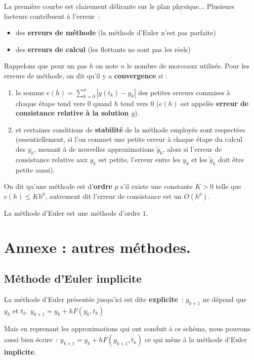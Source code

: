 La première courbe est clairement délirante sur le plan physique...
Plusieurs facteurs contribuent à l'erreur~:

\begin{itemize}
\item des \textbf{erreurs de méthode} (la méthode d'Euler n'est pas parfaite)
\item des \textbf{erreurs de calcul} (les flottants ne sont pas les réels)
\end{itemize}

Rappelons que pour un pas $h$ on note $n$ le nombre de morceaux utilisés. Pour les erreurs de méthode, on dit qu'il y a \textbf{convergence} si :
\begin{enumerate}
\item la somme $e(h)=\displaystyle\sum_{k=0}^n |y(t_k)-y_k|$ des petites erreurs 
commises à 
chaque étape tend vers $0$ quand $h$ tend vers $0$ ($e(h)$ est appelée 
  \textbf{erreur de consistance relative à la solution $y$}).
\item et certaines conditions de \textbf{stabilité} de la méthode employée sont
  respectées (essentiellement, si l'on commet une petite erreur à chaque étape du calcul des $y_k$, 
  menant à de nouvelles approximations $\tilde{y}_k$, alors si l'erreur de consistance relative aux $y_k$
  est petite, l'erreur entre les $y_k$ et les $\tilde{y}_k$ doit être petite aussi).
\end{enumerate}

On dit qu'une méthode est d'\textbf{ordre $p$} s'il existe une constante $K>0$ telle que
$e(h)\leq Kh^p$, autrement dit l'erreur de consistance est un $O(h^{p})$.

La méthode d'Euler est une méthode d'ordre $1$.


\section{Annexe : autres méthodes.}
\subsection{Méthode d'Euler implicite}
La méthode d'Euler présentée jusqu'ici est dite \textbf{explicite}~:
$y_{k+1}$ ne dépend que $y_k$ et $t_k$.
$
 y_{k+1} = y_{k} + h F(y_{k},t_{k})
$

Mais en reprenant les approximations qui ont conduit à ce schéma, 
nous pouvons aussi bien écrire~: $ y_{k+1} = y_{k} + h F(y_{k+1},t_{k})$ 
ce qui mène à la méthode d'Euler \textbf{implicite}.

